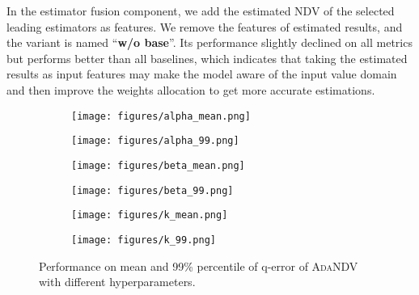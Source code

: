 In the estimator fusion component, we add the estimated NDV of the selected leading estimators as features. 
We remove the features of estimated results, and the variant is named ``\textbf{{w/o} base}''. 
Its performance slightly declined on all metrics but performs better than all baselines, which indicates that taking the estimated results as input features may make the model aware of the input value domain and then improve the weights allocation to get more accurate estimations.


\begin{figure*}[t]
     \centering
    \begin{subfigure}{0.16\textwidth}
         \centering
         \texttt{[image: figures/alpha\_mean.png]}
     \end{subfigure}
     \hfill
     \begin{subfigure}{0.16\textwidth}
         \centering
         \texttt{[image: figures/alpha\_99.png]}
     \end{subfigure}
     \hfill
     \begin{subfigure}{0.16\textwidth}
         \centering
         \texttt{[image: figures/beta\_mean.png]}
     \end{subfigure}
     \hfill
     \begin{subfigure}{0.16\textwidth}
         \centering
         \texttt{[image: figures/beta\_99.png]}
     \end{subfigure}
     \hfill
     \begin{subfigure}{0.16\textwidth}
         \centering
         \texttt{[image: figures/k\_mean.png]}
     \end{subfigure}
     \hfill
     \begin{subfigure}{0.16\textwidth}
         \centering
         \texttt{[image: figures/k\_99.png]}
     \end{subfigure}
     \hfill
    \caption{Performance on mean and 99\% percentile of q-error of \textsc{AdaNDV} with different hyperparameters.}
    \label{fig:hyper-all}
\end{figure*}




